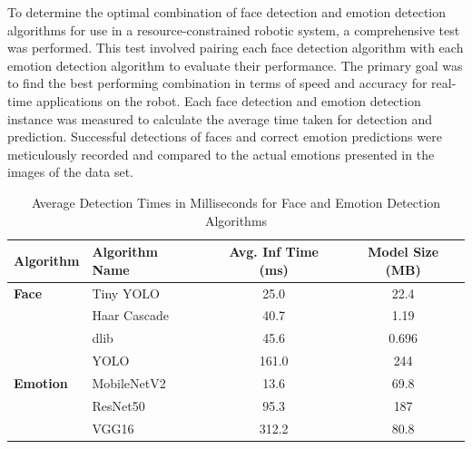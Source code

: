 To determine the optimal combination of face detection and emotion detection algorithms for use in a resource-constrained robotic system, a comprehensive test was performed. This test involved pairing each face detection algorithm with each emotion detection algorithm to evaluate their performance. The primary goal was to find the best performing combination in terms of speed and accuracy for real-time applications on the robot. Each face detection and emotion detection instance was measured to calculate the average time taken for detection and prediction. Successful detections of faces and correct emotion predictions were meticulously recorded and compared to the actual emotions presented in the images of the data set.

\begin{table}[h!]
\centering{}
\caption{Average Detection Times in Milliseconds for Face and Emotion Detection Algorithms}
\begin{tabular}{|l|l|c|c|}
\hline
\textbf{Algorithm} & \textbf{Algorithm Name} & \textbf{Avg. Inf Time (ms)} & \textbf{Model Size (MB)}\\ \hline
\textbf{Face}           & Tiny YOLO               & 25.0    &   22.4                    \\ \cline{2-4}
                        & Haar Cascade            & 40.7    &   1.19                    \\ \cline{2-4}
                        & dlib                    & 45.6    &   0.696                   \\ \cline{2-4}
                        & YOLO                    & 161.0   &   244                     \\ \hline
\textbf{Emotion}        & MobileNetV2             & 13.6    &   69.8                    \\ \cline{2-4}
                        & ResNet50                & 95.3    &   187                     \\ \cline{2-4}
                        & VGG16                   & 312.2   &   80.8                    \\ \hline
\end{tabular}
\label{tab:algorithm_detection_times_ms}
\end{table}


